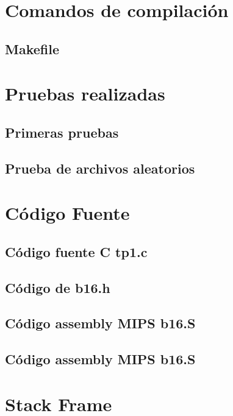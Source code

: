 \documentclass{article}
\begin{document}
\section{Comandos de compilación}
\subsection{Makefile}


\section{Pruebas realizadas}
\subsection{Primeras pruebas}

\subsection{Prueba de archivos aleatorios}


\section{C\'odigo Fuente}
\subsection{C\'odigo fuente C tp1.c}

\subsection{C\'odigo de b16.h}

\subsection{C\'odigo assembly MIPS b16.S}

\subsection{C\'odigo assembly MIPS b16.S}


\section{Stack Frame}
\end{document}
